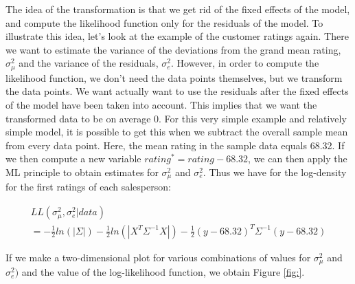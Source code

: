 

The idea of the transformation is that we get rid of the fixed effects of the model, and compute the likelihood function only for the residuals of the model. To illustrate this idea, let's look at the example of the customer ratings again. There we want to estimate the variance of the deviations from the grand mean rating, $\sigma_\mu^2$ and the variance of the residuals, $\sigma^2_e$. However, in order to compute the likelihood function, we don't need the data points themselves, but we transform the data points. We want actually want to use the residuals after the fixed effects of the model have been taken into account. This implies that we want the transformed data to be on average 0. For this very simple example and relatively simple model, it is possible to get this when we subtract the overall sample mean from every data point. Here, the mean rating in the sample data equals 68.32. If we then compute a new variable $rating^*= rating - 68.32$, we can then apply the ML principle to obtain estimates for $\sigma_\mu^2$ and $\sigma^2_e$. Thus we have for the log-density for the first ratings of each salesperson:


\begin{eqnarray}
LL(\sigma_\mu^2, \sigma^2_e|data) \nonumber\\
=
-\frac{1}{2} ln(|\Sigma|)  
-\frac{1}{2}ln(|X^{T}\Sigma^{-1}X|) 
-\frac{1}{2}  (y-68.32)^{T}  \Sigma^{-1}  (y-68.32)
\end{eqnarray}

If we make a two-dimensional plot for various combinations of values for $\sigma_\mu^2$ and $\sigma^2_e)$ and the value of the log-likelihood function, we obtain Figure \ref{fig:}.


\begin{knitrout}
\color{fgcolor}\begin{kframe}


{\ttfamily\noindent\bfseries{}}

{\ttfamily\noindent\bfseries{}}

{\ttfamily\noindent\bfseries\color{errorcolor}{\#\# Error in geom\_text(aes(x = x, y = y, z = NULL, label = level), data = data[indices, : could not find function "{}geom\_text"{}}}\end{kframe}
\end{knitrout}




